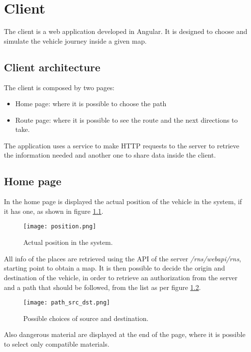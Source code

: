 \chapter{Client}\label{Chap:Client}
The client is a web application developed in Angular. It is designed to choose and simulate the vehicle journey inside a given map.

\section{Client architecture}
The client is composed by two pages:
\begin{itemize}
	\item Home page: where it is possible to choose the path
	\item Route page: where it is possible to see the route and the next directions to take.
\end{itemize}
The application uses a service to make HTTP requests to the server to retrieve the information needed and another one to share data inside the client.
\newpage

\section{Home page}

In the home page is displayed the actual position of the vehicle in the system, if it has one, as shown in figure \ref{Fig:Position}.

\begin{figure}[!htb]
	\centering
	\texttt{[image: position.png]}
	\caption{Actual position in the system.}\label{Fig:Position}
\end{figure}

All info of the places are retrieved using the API of the server \textit{/rns/webapi/rns}, starting point to obtain a map. It is then possible to decide the origin and destination of the vehicle, in order to retrieve an authorization from the server and a path that should be followed, from the list as per figure \ref{Fig:src_dst}.

\begin{figure}[!htb]
	\centering
	\texttt{[image: path\_src\_dst.png]}
	\caption{Possible choices of source and destination.}\label{Fig:src_dst}
\end{figure}

\newpage
Also dangerous material are displayed at the end of the page, where it is possible to select only compatible materials.

